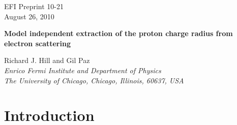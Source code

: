 \documentclass[12pt]{article}
\begin{document}
\begin{titlepage}

\begin{flushright}
EFI Preprint 10-21\\
August 26, 2010
\end{flushright}

\vspace{0.7cm}
\begin{center}
\Large\bf 
Model independent extraction of 
the proton charge radius from electron scattering
\end{center}

\vspace{0.8cm}
\begin{center}
{\sc   Richard J. Hill and Gil Paz}\\
\vspace{0.4cm}
{\it Enrico Fermi Institute and Department of Physics \\
The University of Chicago, Chicago, Illinois, 60637, USA
}
\end{center}
\vspace{1.0cm}
\begin{abstract}
  \vspace{0.2cm}
  \noindent
Constraints from analyticity are combined with experimental 
electron-proton scattering data to determine the proton charge
radius.  
In contrast to previous determinations, we provide a systematic procedure
for analyzing arbitrary data without model-dependent assumptions on the form factor 
shape. 
We also investigate the impact of including electron-neutron 
scattering data, and $\pi\pi\to N\bar{N}$ data.
Using representative datasets we find 
$r_E^p=0.870 \pm 0.023 \pm 0.012 \,{\rm fm}$ using just proton scattering data;
$r_E^p=0.880^{+0.017}_{-0.020} \pm 0.007 \,{\rm fm}$ adding neutron data; and 
$r_E^p=0.871 \pm 0.009 \pm 0.002 \pm 0.002 \,{\rm fm}$ adding $\pi\pi$ data. 
The analysis can be readily extended to other nucleon form factors and derived 
observables. 
\end{abstract}
\vfil

\end{titlepage}


\section{Introduction}
\end{document}
